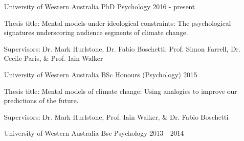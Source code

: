 

\begin{cventries}

  \cventry
    {University of Western Australia} %
    {PhD Psychology} %
    {}%
    {2016 - present} %
    {
      \begin{cvitems} %
        \item {Thesis title: Mental models under ideological constraints: The psychological signatures underscoring audience segments of climate change.}
        \item {Supervisors: Dr. Mark Hurlstone, Dr. Fabio Boschetti, Prof. Simon Farrell, Dr. Cecile Paris, \& Prof. Iain Walker}
      \end{cvitems}
    }

  \cventry
    {University of Western Australia} %
    {BSc Honours (Psychology)} %
    {} %
    {2015} %
    {
      \begin{cvitems} %
        \item {Thesis title: Mental models of climate change: Using analogies to improve our predictions of the future.}
        \item {Supervisors: Dr. Mark Hurlstone, Prof. Iain Walker, \& Dr. Fabio Boschetti}
      \end{cvitems}
    }

  \cventry
    {University of Western Australia} %
    {Bsc Psychology} %
    {} %
    {2013 - 2014} %
    {}

\end{cventries}
